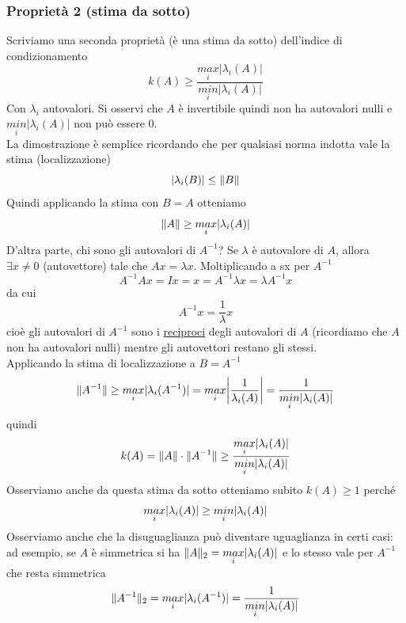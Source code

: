 \documentclass[12pt,a4paper]{article}
\DeclarePairedDelimiter{\abs}{\lvert}{\rvert}
\DeclarePairedDelimiter{\norma}{\lVert}{\rVert}
\begin{document}
\subsubsection{Proprietà 2 (stima da sotto)}
Scriviamo una seconda proprietà (è una stima da sotto) dell'indice di condizionamento
\begin{equation*}
    k(A)\geq\frac{\underset{i}{max}|\lambda_i(A)|}{\underset{i}{min}|\lambda_i(A)|}
\end{equation*}
Con $\lambda_i$ autovalori. Si osservi che $A$ è invertibile quindi non ha autovalori nulli e $\underset{i}{min}|\lambda_i(A)|$ non può essere 0.\\La dimostrazione è semplice ricordando che per qualsiasi norma indotta vale la stima (localizzazione)
\begin{equation*}
    |\lambda_i(B)|\leq\norma{B}
\end{equation*}
Quindi applicando la stima con $B=A$ otteniamo
\begin{equation*}
    \norma{A}\geq\underset{i}{max}|\lambda_i(A)|
\end{equation*}
D'altra parte, chi sono gli autovalori di $A^{-1}$? Se $\lambda$ è autovalore di $A$, allora $\exists x \neq 0$ (autovettore) tale che $Ax=\lambda x$. Moltiplicando a sx per $A^{-1}$
\begin{equation*}
    A^{-1}Ax=Ix=x=A^{-1}\lambda x=\lambda A^{-1}x
\end{equation*}
da cui
\begin{equation*}
    A^{-1}x=\frac{1}{\lambda}x
\end{equation*}
cioè gli autovalori di $A^{-1}$ sono i \uline{reciproci} degli autovalori di $A$ (ricordiamo che $A$ non ha autovalori nulli) mentre gli autovettori restano gli stessi.\\
Applicando la stima di localizzazione a $B = A^{-1}$
\[
\norma{A^{-1}} \ge \underset{i}{max} \abs{\lambda_i (A^{-1})} = \underset{i}{max} \abs*{\frac{1}{\lambda_i (A)}} = \frac{1}{\underset{i}{min} \abs{\lambda_i(A)}}
\]
quindi
\[
k(A) = \norma{A} \cdot \norma{A^{-1}} \ge \frac{\underset{i}{max} \abs{\lambda_i (A)}}{\underset{i}{min} \abs{\lambda_i (A)}}
\]
Osserviamo anche da questa stima da sotto otteniamo subito $k(A) \ge 1$ perché
\[
\underset{i}{max} \abs{\lambda_i(A)} \ge \underset{i}{min} \abs{\lambda_i(A)}
\]
Osserviamo anche che la disuguaglianza può diventare uguaglianza in certi casi: ad esempio, se $A$ è simmetrica si ha $\norma{A}_2 = \underset{i}{max} \abs{\lambda_i (A)}$ e lo stesso vale per $A^{-1}$ che resta simmetrica
\[
\norma{A^{-1}}_2 = \underset{i}{max} \abs{\lambda_i (A^{-1})} = \frac{1}{\underset{i}{min} \abs{\lambda_i(A)}}
\]
\end{document}
